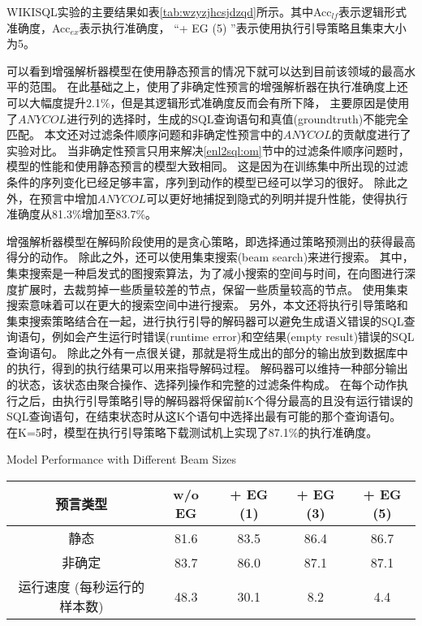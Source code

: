 WIKISQL实验的主要结果如表\ref{tab:wzyzjhcsjdzqd}所示。其中Acc$_{lf}$表示逻辑形式准确度，Acc$_{ex}$表示执行准确度，
“+ EG (5) ”表示使用执行引导策略且集束大小为5。

可以看到增强解析器模型在使用静态预言的情况下就可以达到目前该领域的最高水平\cite{dong2018coarse}的范围。
在此基础之上，使用了非确定性预言的增强解析器在执行准确度上还可以大幅度提升2.1\%，但是其逻辑形式准确度反而会有所下降，
主要原因是使用了$ANYCOL$进行列的选择时，生成的SQL查询语句和真值(groundtruth)不能完全匹配。
本文还对过滤条件顺序问题和非确定性预言中的$ANYCOL$的贡献度进行了实验对比。
当非确定性预言只用来解决\ref{enl2sql:om}节中的过滤条件顺序问题时，模型的性能和使用静态预言的模型大致相同。
这是因为在训练集中所出现的过滤条件的序列变化已经足够丰富，序列到动作的模型已经可以学习的很好。
除此之外，在预言中增加$ANYCOL$可以更好地捕捉到隐式的列明并提升性能，使得执行准确度从81.3\%增加至83.7\%。

增强解析器模型在解码阶段使用的是贪心策略，即选择通过策略预测出的获得最高得分的动作。
除此之外，还可以使用集束搜索(beam search)来进行搜索。
其中，集束搜索是一种启发式的图搜索算法，为了减小搜索的空间与时间，在向图进行深度扩展时，去裁剪掉一些质量较差的节点，保留一些质量较高的节点。
使用集束搜索意味着可以在更大的搜索空间中进行搜索。
另外，本文还将执行引导策略和集束搜索策略结合在一起，进行执行引导的解码器可以避免生成语义错误的SQL查询语句，例如会产生运行时错误(runtime error)和空结果(empty result)错误的SQL查询语句。
除此之外有一点很关键，那就是将生成出的部分的输出放到数据库中的执行，得到的执行结果可以用来指导解码过程。
解码器可以维持一种部分输出的状态，该状态由聚合操作、选择列操作和完整的过滤条件构成。
在每个动作执行之后，由执行引导策略引导的解码器将保留前K个得分最高的且没有运行错误的SQL查询语句，在结束状态时从这K个语句中选择出最有可能的那个查询语句。
在K=5时，模型在执行引导策略下载测试机上实现了87.1\%的执行准确度。

\begin{table}[!hpb]
  \centering
    {Model Performance with Different Beam Sizes}
  \label{enl2sql:sybtjsdxdmxxn}
  \begin{tabular}{ccccc} \toprule
    \textbf{预言类型} & \textbf{w/o EG} & \textbf{+ EG (1)} & \textbf{+ EG (3)} & \textbf{+ EG (5)}\\\midrule
    静态 & 81.6 & 83.5 & 86.4 & 86.7\\
    非确定 & 83.7 & 86.0 & 87.1 & 87.1\\\midrule
    运行速度 (每秒运行的样本数) & 48.3 & 30.1 & 8.2 & 4.4\\
    \bottomrule
  \end{tabular}
\end{table}

